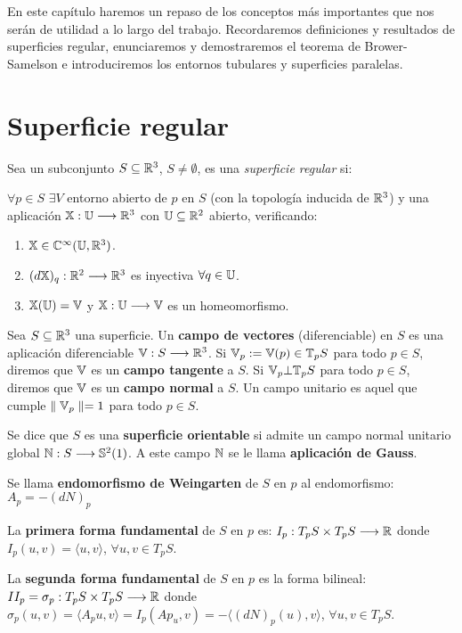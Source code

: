 En este capítulo haremos un repaso de los conceptos más importantes que nos serán de utilidad a lo largo del trabajo. Recordaremos definiciones y resultados de superficies regular, enunciaremos y demostraremos el teorema de Brower-Samelson e introduciremos los entornos tubulares y superficies paralelas.

\section{Superficie regular}

\begin{definition}
Sea un subconjunto $S \subseteq \mathbb{R}^3$, $S \neq \emptyset$, es una \textit{superficie regular} si:

$\forall p \in S$ $\exists V$ entorno abierto de $p$ en $S$ (con la topología inducida de $\mathbb{R}^3$) y una aplicación $\mathbb{X}: \mathbb{U} \longrightarrow \mathbb{R}^3$ con $\mathbb{U} \subseteq \mathbb{R}^2$ abierto, verificando:

\begin{enumerate}
    \item $\mathbb{X} \in \mathbb{C}^\infty(\mathbb{U}, \mathbb{R}^3)$.
    \item $(d\mathbb{X})_{q}: \mathbb{R}^2 \longrightarrow \mathbb{R}^3$ es inyectiva $\forall q \in \mathbb{U}$.
    \item $\mathbb{X}(\mathbb{U}) = \mathbb{V}$ y $\mathbb{X}:\mathbb{U} \longrightarrow \mathbb{V}$ es un homeomorfismo.
\end{enumerate}
\end{definition}

Sea $S \subseteq \mathbb{R}^3$ una superficie. Un \textbf{campo de vectores} (diferenciable) en $S$ es una aplicación diferenciable $\mathbb{V}: S \longrightarrow \mathbb{R}^3$. Si $\mathbb{V}_p := \mathbb{V}(p) \in \mathbb{T}_p S$ para todo $p \in S$, diremos que $\mathbb{V}$ es un \textbf{campo tangente} a $S$. Si $\mathbb{V}_p \bot \mathbb{T}_p S$ para todo $p \in S$, diremos que $\mathbb{V}$ es un \textbf{campo normal} a $S$. Un campo unitario es aquel que cumple $\parallel \mathbb{V}_p \parallel = 1$ para todo $p \in S$.

Se dice que $S$ es una \textbf{superficie orientable} si admite un campo normal unitario global $\mathbb{N}: S \longrightarrow \mathbb{S}^2(1)$. A este campo $\mathbb{N}$ se le llama \textbf{aplicación de Gauss}.

Se llama \textbf{endomorfismo de Weingarten} de $S$ en $p$ al endomorfismo: $A_p = -(dN)_p$

\begin{definition}
La \textbf{primera forma fundamental} de $S$ en $p$ es: $I_p: T_pS \times T_pS \longrightarrow \mathbb{R}$ donde $I_p(u,v) =  \langle u,v \rangle $, $\forall u,v \in T_pS$.

La \textbf{segunda forma fundamental} de $S$ en $p$ es la forma bilineal: $II_p = \sigma_p: T_pS \times T_pS \longrightarrow \mathbb{R}$ donde $\sigma_p(u,v) =  \langle A_pu,v \rangle  = I_p(Ap_u,v) = - \langle (dN)_p(u), v \rangle $, $\forall u,v \in T_pS$.
\end{definition}

